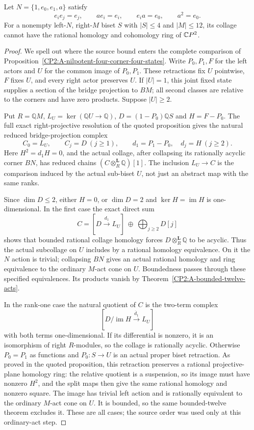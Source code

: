 \begin{lemma}
\label{CP2:A-nilpotent-four-four-states-twelve}
Let $N=\{1,e_0,e_1,a\}$ satisfy
\[
 e_i e_j=e_j,\qquad ae_i=e_i,\qquad e_i a=e_0,
 \qquad a^2=e_0.
\]
For a nonempty left-$N$, right-$M$ biset $S$ with
$|S|\le4$ and $|M|\le12$, its collage cannot have the
rational homology and cohomology ring of $\mathbb{C}P^2$.
\end{lemma}
\begin{proof}
We spell out where the source bound enters the complete
comparison of Proposition~\ref{CP2:A-nilpotent-four-corner-four-states}.
Write $P_0,P_1,F$ for the left actors and $U$ for the common
image of $P_0,P_1$. These retractions fix $U$ pointwise,
$F$ fixes $U$, and every right actor preserves $U$. If
$|U|=1$, this joint fixed state supplies a section of the
bridge projection to $BM$; all second classes are relative
to the corners and have zero products. Suppose $|U|\ge2$.

Put $R=\mathbb QM$, $L_U=\ker(\mathbb QU\to\mathbb Q)$,
$D=(1-P_0)\mathbb QS$ and $H=F-P_0$. The full exact
right-projective resolution of the quoted proposition gives
the natural reduced bridge-projection complex
\[
 C_0=L_U,\qquad C_j=D\ (j\ge1),\qquad
 d_1=P_1-P_0,\quad d_j=H\ (j\ge2).
\]
Here $H^2=d_1H=0$, and the actual collage, after collapsing
its rationally acyclic corner $BN$, has reduced chains
$(C\otimes_R^{\mathbf L}\mathbb Q)[1]$. The inclusion
$L_U\to C$ is the comparison induced by the actual
sub-biset $U$, not just an abstract map with the same ranks.

Since $\dim D\le2$, either $H=0$, or $\dim D=2$ and
$\ker H=\operatorname{im}H$ is one-dimensional. In the
first case the exact direct sum
\[
 C=[D\xrightarrow{d_1}L_U]\ \oplus\
       \bigoplus_{j\ge2}D[j]
\]
shows that bounded rational collage homology forces
$D\otimes_R^{\mathbf L}\mathbb Q$ to be acyclic.
Thus the actual subcollage on $U$ includes by a rational
homology equivalence. On it the $N$ action is trivial;
collapsing $BN$ gives an actual rational homology and ring
equivalence to the ordinary $M$-act cone on $U$. Boundedness
passes through these specified equivalences. Its products
vanish by Theorem~\ref{CP2:A-bounded-twelve-acts}.

In the rank-one case the natural quotient of $C$ is the
two-term complex
\[
 [D/\operatorname{im}H\xrightarrow{\overline d_1}L_U]
\]
with both terms one-dimensional. If its differential is
nonzero, it is an isomorphism of right $R$-modules, so the
collage is rationally acyclic. Otherwise $P_0=P_1$ as
functions and $P_0:S\to U$ is an actual proper biset
retraction. As proved in the quoted proposition, this
retraction preserves a rational projective-plane homology
ring: the relative quotient is a suspension, so its image
must have nonzero $H^2$, and the split maps then give the
same rational homology and nonzero square. The image has
trivial left action and is rationally equivalent to the
ordinary $M$-act cone on $U$. It is bounded, so the same
bounded-twelve theorem excludes it. These are all cases;
the source order was used only at this ordinary-act step.
\end{proof}

